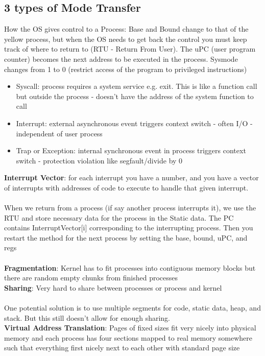 \documentclass{article}
\begin{document}
\subsection{3 types of Mode Transfer}
How the OS gives control to a Process: Base and Bound change to that of the yellow process, but when the OS needs to get back the control you must keep track of where to return to (RTU - Return From User). The uPC (user program counter) becomes the next address to be executed in the process. Sysmode changes from 1 to 0 (restrict access of the program to privileged instructions)
\begin{itemize}
\item Syscall: process requires a system service e.g. exit. This is like a function call but outside the process - doesn't have the address of the system function to call
\item Interrupt: external asynchronous event triggers context switch - often I/O - independent of user process
\item Trap or Exception: internal synchronous event in process triggers context switch - protection violation like segfault/divide by 0
\end{itemize}
\textbf{Interrupt Vector}: for each interrupt you have a number, and you have a vector of interrupts with addresses of code to execute to handle that given interrupt. \\ \\
When we return from a process (if say another process interrupts it), we use the RTU and store necessary data for the process in the Static data. The PC contains InterruptVector[i] corresponding to the interrupting process. Then you restart the method for the next process by setting the base, bound, uPC, and regs \\ \\
\textbf{Fragmentation}: Kernel has to fit processes into contiguous memory blocks but there are random empty chunks from finished processes \\
\textbf{Sharing}: Very hard to share between processes or process and kernel \\ \\
One potential solution is to use multiple segments for code, static data, heap, and stack. But this still doesn't allow for enough sharing. \\ 
\textbf{Virtual Address Translation}: Pages of fixed sizes fit very nicely into physical memory and each process has four sections mapped to real memory somewhere such that everything first nicely next to each other with standard page size
\end{document}

